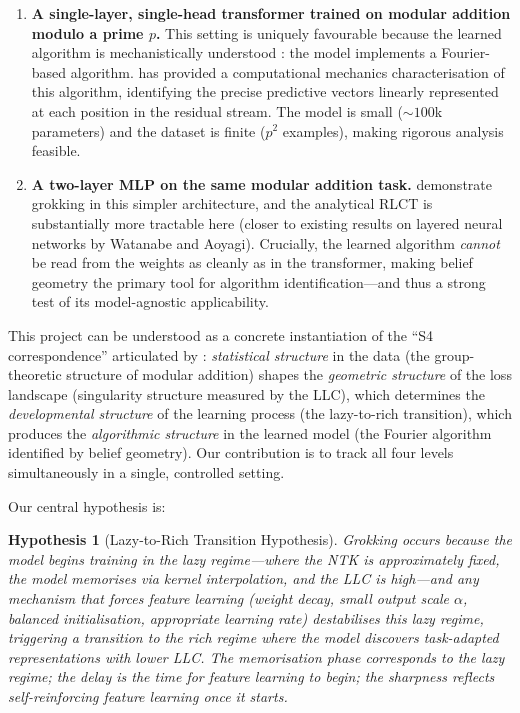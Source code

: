 \documentclass[11pt,a4paper]{article}
\newtheorem{hypothesis}{Hypothesis}
\begin{document}
\begin{enumerate}[label=(\roman*)]
    \item \textbf{A single-layer, single-head transformer trained on modular addition modulo a prime $p$.} This setting is uniquely favourable because the learned algorithm is mechanistically understood \citep{nanda2023progress, chughtai2023toy, yip2024modular, wu2024unified}: the model implements a Fourier-based algorithm. \citet{poncini2025compmech} has provided a computational mechanics characterisation of this algorithm, identifying the precise predictive vectors linearly represented at each position in the residual stream. The model is small (${\sim}100$k parameters) and the dataset is finite ($p^2$ examples), making rigorous analysis feasible.

    \item \textbf{A two-layer MLP on the same modular addition task.} \citet{kumar2024grokking} demonstrate grokking in this simpler architecture, and the analytical RLCT is substantially more tractable here (closer to existing results on layered neural networks by Watanabe and Aoyagi). Crucially, the learned algorithm \emph{cannot} be read from the weights as cleanly as in the transformer, making belief geometry the primary tool for algorithm identification---and thus a strong test of its model-agnostic applicability.
\end{enumerate}

This project can be understood as a concrete instantiation of the ``S4 correspondence'' articulated by \citet{pepinlehalleur2025youare}: \emph{statistical structure} in the data (the group-theoretic structure of modular addition) shapes the \emph{geometric structure} of the loss landscape (singularity structure measured by the LLC), which determines the \emph{developmental structure} of the learning process (the lazy-to-rich transition), which produces the \emph{algorithmic structure} in the learned model (the Fourier algorithm identified by belief geometry). Our contribution is to track all four levels simultaneously in a single, controlled setting.

Our central hypothesis is:

\begin{hypothesis}[Lazy-to-Rich Transition Hypothesis]
Grokking occurs because the model begins training in the lazy regime---where the NTK is approximately fixed, the model memorises via kernel interpolation, and the LLC is high---and any mechanism that forces feature learning (weight decay, small output scale $\alpha$, balanced initialisation, appropriate learning rate) destabilises this lazy regime, triggering a transition to the rich regime where the model discovers task-adapted representations with lower LLC. The memorisation phase corresponds to the lazy regime; the delay is the time for feature learning to begin; the sharpness reflects self-reinforcing feature learning once it starts.
\end{hypothesis}
\end{document}
